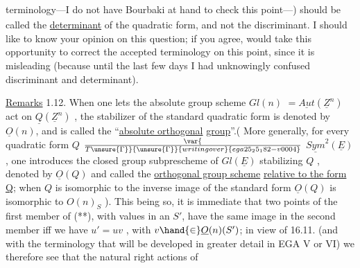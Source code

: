 
\textsubscript{\unsure{,}} terminology---I do not have Bourbaki at hand to check this
point---) should be called the \uline{determinant} of the quadratic form, and not
the discriminant. I should like to know your opinion on this question; if
you agree,  would take this opportunity to correct the
accepted terminology on this point, since it is misleading (because until
the last few days I had unknowingly confused discriminant and
determinant).

\uline{Remarks} 1.12. When one lets the absolute group scheme
$Gl(n)$  $= \underline{Aut}(\underline{Z}^n )$ act on $\underline{Q}(\underline{Z}^n)$ , the stabilizer of the standard quadratic
form is denoted by $\underline{O}(n)$, and is called the ``\uline{absolute orthogonal}
\uline{group}''.( More generally, for every quadratic form $Q$ \hand{$\in$}
$\var{\over{T}{\unsure{\Gamma}}}{\unsure{\Gamma}}{writing over}{ega25_25_182-v0004}$ $\underline{Sym}^2(\underline{E})$ , one introduces the closed group subprescheme of
$Gl(\underline{E})$  stabilizing $Q$ , denoted by $\underline{O}(Q)$ and called the \uline{orthogonal group scheme}
\uline{relative to the form Q}; when $Q$ is isomorphic to the inverse
image of the standard form \hand{,} $\underline{O}(Q)$ is isomorphic to $O(n)_S$ ). This being so,
it is immediate that two points  of the first member of (**), with values in
an $S'$, have the same image in the second member iff 
 we have $u' = uv$ , with $v \hand{\in} \underline{O}(n)(S')$; in view of 16.11. (and
with the terminology that will be developed in greater detail in
EGA V or VI) we therefore see that the natural right actions of
